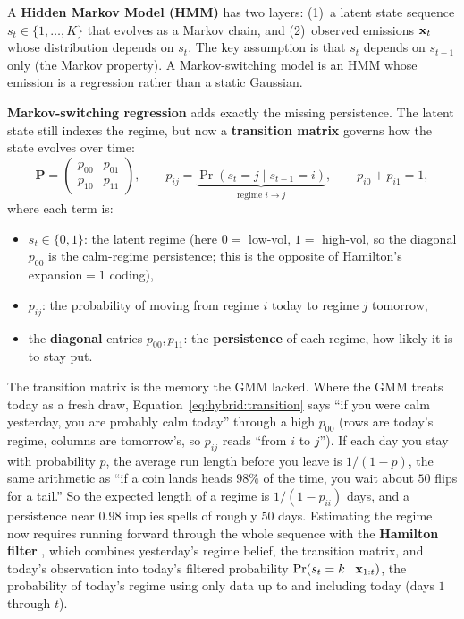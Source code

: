 \begin{prereq}
A \textbf{Hidden Markov Model (HMM)} has two layers: (1)~a latent state
sequence $s_t \in \{1, \ldots, K\}$ that evolves as a Markov chain, and
(2)~observed emissions $\mathbf{x}_t$ whose distribution depends on $s_t$.  The
key assumption is that $s_t$ depends on $s_{t-1}$ only (the Markov
property).  A Markov-switching model is an HMM whose emission is a
regression rather than a static Gaussian.
\end{prereq}

\textbf{Markov-switching regression} \citep{Hamilton1989} adds exactly the
missing persistence.  The latent state still indexes the regime, but now a
\textbf{transition matrix} governs how the state evolves over time:
\begin{equation}\label{eq:hybrid:transition}
  \mathbf{P} = \begin{pmatrix}
    p_{00} & p_{01} \\
    p_{10} & p_{11}
  \end{pmatrix},
  \qquad
  p_{ij} = \underbrace{\Pr(s_t = j \mid s_{t-1} = i)}_{\text{regime } i \to j},
  \qquad p_{i0} + p_{i1} = 1,
\end{equation}
where each term is:
\begin{itemize}
  \item $s_t \in \{0,1\}$: the latent regime (here $0=$ low-vol,
        $1=$ high-vol, so the diagonal $p_{00}$ is the calm-regime
        persistence; this is the opposite of Hamilton's expansion$=1$
        coding),
  \item $p_{ij}$: the probability of moving from regime $i$ today to
        regime $j$ tomorrow,
  \item the \textbf{diagonal} entries $p_{00}, p_{11}$: the
        \textbf{persistence} of each regime, how likely it is to stay
        put.
\end{itemize}

\begin{intuition}
The transition matrix is the memory the GMM lacked.  Where the GMM treats
today as a fresh draw, Equation~\eqref{eq:hybrid:transition} says ``if you
were calm yesterday, you are probably calm today'' through a high $p_{00}$
(rows are today's regime, columns are tomorrow's, so $p_{ij}$ reads ``from
$i$ to $j$'').  If each day you stay with probability $p$, the average run
length before you leave is $1/(1-p)$, the same arithmetic as ``if a coin
lands heads $98\%$ of the time, you wait about $50$ flips for a tail.''  So
the expected length of a regime is $1/(1-p_{ii})$ days, and a persistence
near $0.98$ implies spells of roughly $50$ days.  Estimating the
regime now requires running forward through the whole sequence with the
\textbf{Hamilton filter} \citep{Hamilton1989}, which combines yesterday's
regime belief, the transition matrix, and today's observation into
today's filtered probability $\Pr(s_t = k \mid \mathbf{x}_{1:t})$, the
probability of today's regime using only data up to and including today
(days $1$ through $t$).
\end{intuition}

